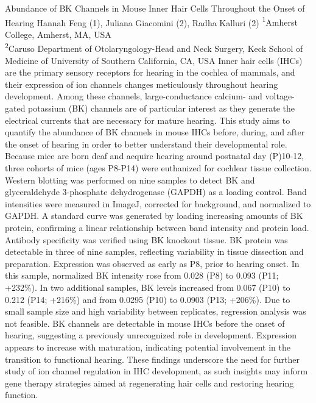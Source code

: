 \makeabstract
{
Abundance of BK Channels in Mouse Inner Hair Cells Throughout the Onset of Hearing
}
{
Hannah Feng (1), Juliana Giacomini (2), Radha Kalluri (2)
}
{
\textsuperscript{1}Amherst College, Amherst, MA, USA\\
\textsuperscript{2}Caruso Department of Otolaryngology-Head and Neck Surgery, Keck School of Medicine of University of Southern California, CA, USA
}
{
Inner hair cells (IHCs) are the primary sensory receptors for hearing in the cochlea of mammals, and their expression of ion channels changes meticulously throughout hearing development. Among these channels, large-conductance calcium- and voltage-gated potassium (BK) channels are of particular interest as they generate the electrical currents that are necessary for mature hearing. This study aims to quantify the abundance of BK channels in mouse IHCs before, during, and after the onset of hearing in order to better understand their developmental role.
}
{
Because mice are born deaf and acquire hearing around postnatal day (P)10-12, three cohorts of mice (ages P8-P14) were euthanized for cochlear tissue collection. Western blotting was performed on nine samples to detect BK and glyceraldehyde 3-phosphate dehydrogenase (GAPDH) as a loading control. Band intensities were measured in ImageJ, corrected for background, and normalized to GAPDH. A standard curve was generated by loading increasing amounts of BK protein, confirming a linear relationship between band intensity and protein load. Antibody specificity was verified using BK knockout tissue.
}
{
BK protein was detectable in three of nine samples, reflecting variability in tissue dissection and preparation. Expression was observed as early as P8, prior to hearing onset. In this sample, normalized BK intensity rose from 0.028 (P8) to 0.093 (P11; +232\%). In two additional samples, BK levels increased from 0.067 (P10) to 0.212 (P14; +216\%) and from 0.0295 (P10) to 0.0903 (P13; +206\%). Due to small sample size and high variability between replicates, regression analysis was not feasible.
}
{
BK channels are detectable in mouse IHCs before the onset of hearing, suggesting a previously unrecognized role in development. Expression appears to increase with maturation, indicating potential involvement in the transition to functional hearing. These findings underscore the need for further study of ion channel regulation in IHC development, as such insights may inform gene therapy strategies aimed at regenerating hair cells and restoring hearing function.
}

\newpage

